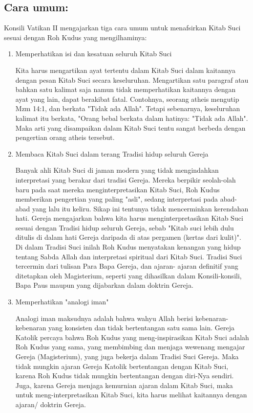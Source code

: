 \subsection{Cara umum:}
Konsili Vatikan II mengajarkan tiga cara umum untuk menafsirkan Kitab Suci sesuai dengan Roh Kudus yang mengilhaminya:
\begin{enumerate}
\item Memperhatikan isi dan kesatuan seluruh Kitab Suci

Kita harus mengartikan ayat tertentu dalam Kitab Suci dalam kaitannya dengan pesan Kitab Suci secara keseluruhan. Mengartikan satu paragraf atau bahkan satu kalimat saja namun tidak memperhatikan kaitannya dengan ayat yang lain, dapat berakibat fatal. Contohnya, seorang atheis mengutip Mzm 14:1, dan berkata "Tidak ada Allah". Tetapi sebenarnya, keseluruhan kalimat itu berkata, "Orang bebal berkata dalam hatinya: "Tidak ada Allah". Maka arti yang disampaikan dalam Kitab Suci tentu sangat berbeda dengan pengertian orang atheis tersebut.

\item Membaca Kitab Suci dalam terang Tradisi hidup seluruh Gereja

Banyak ahli Kitab Suci di jaman modern yang tidak mengindahkan interpretasi yang berakar dari tradisi Gereja. Mereka berpikir seolah-olah baru pada saat mereka menginterpretasikan Kitab Suci, Roh Kudus memberikan pengertian yang paling "asli", sedang interpretasi pada abad- abad yang lalu itu keliru. Sikap ini tentunya tidak mencerminkan kerendahan hati. Gereja mengajarkan bahwa kita harus menginterpretasikan Kitab Suci sesuai dengan Tradisi hidup seluruh Gereja, sebab "Kitab suci lebih dulu ditulis di dalam hati Gereja daripada di atas pergamen (kertas dari kulit)". Di dalam Tradisi Suci inilah Roh Kudus menyatakan kenangan yang hidup tentang Sabda Allah dan interpretasi spiritual dari Kitab Suci. Tradisi Suci tercermin dari tulisan Para Bapa Gereja, dan ajaran- ajaran definitif yang ditetapkan oleh Magisterium, seperti yang dihasilkan dalam Konsili-konsili, Bapa Paus maupun yang dijabarkan dalam doktrin Gereja.

\item Memperhatikan "analogi iman"

Analogi iman maksudnya adalah bahwa wahyu Allah berisi kebenaran- kebenaran yang konsisten dan tidak bertentangan satu sama lain. Gereja Katolik percaya bahwa Roh Kudus yang meng-inspirasikan Kitab Suci adalah Roh Kudus yang sama, yang membimbing dan menjaga wewenang mengajar Gereja (Magisterium), yang juga bekerja dalam Tradisi Suci Gereja. Maka tidak mungkin ajaran Gereja Katolik bertentangan dengan Kitab Suci, karena Roh Kudus tidak mungkin bertentangan dengan diri-Nya sendiri. Juga, karena Gereja menjaga kemurnian ajaran dalam Kitab Suci, maka untuk meng-interpretasikan Kitab Suci, kita harus melihat kaitannya dengan ajaran/ doktrin Gereja.


\end{enumerate}
